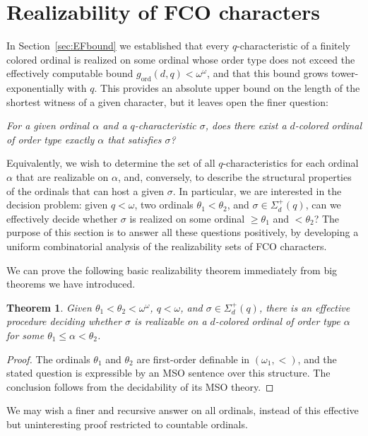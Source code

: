 \documentclass{amsart}
\newtheorem{theorem}{Theorem}
\theoremstyle{definition}
\begin{document}
\section{Realizability of FCO characters}\label{sec:realizability}

In Section~\ref{sec:EFbound} we established that every $q$-characteristic of a finitely colored ordinal is realized on some ordinal whose order type does not exceed the effectively computable bound $g_{\mathrm{ord}}(d,q)<\omega^\omega$, and that this bound grows tower-exponentially with $q$.  This provides an absolute upper bound on the length of the shortest witness of a given character, but it leaves open the finer question: 

\emph{For a given ordinal $\alpha$ and a $q$-characteristic $\sigma$, does there exist a $d$-colored ordinal of order type exactly $\alpha$ that satisfies $\sigma$?}

Equivalently, we wish to determine the set of all $q$-characteristics for each ordinal $\alpha$ that are realizable on $\alpha$, and, conversely, to describe the structural properties of the ordinals that can host a given $\sigma$.  In particular, we are interested in the decision problem: given $q<\omega$, two ordinals $\theta_1<\theta_2$, and $\sigma\in\Sigma_d^+(q)$, can we effectively decide whether $\sigma$ is realized on some ordinal $\geq\theta_1$ and $<\theta_2$?  The purpose of this section is to answer all these questions positively, by developing a uniform combinatorial analysis of the realizability sets of FCO characters.

We can prove the following basic realizability theorem immediately from big theorems we have introduced.

\begin{theorem}\label{lem:interval-realizabiliy}
    Given $\theta_1<\theta_2<\omega^\omega$, $q<\omega$, and $\sigma\in\Sigma_d^+(q)$, there is an effective procedure deciding whether $\sigma$ is realizable on a $d$-colored ordinal of order type $\alpha$ for some $\theta_1\leq\alpha<\theta_2$.
\end{theorem}
\begin{proof}
    The ordinals $\theta_1$ and $\theta_2$ are first-order definable in $(\omega_1,<)$, and the stated question is expressible by an MSO sentence over this structure. The conclusion follows from the decidability of its MSO theory.
\end{proof}

We may wish a finer and recursive answer on all ordinals, instead of this effective but uninteresting proof restricted to countable ordinals.
\end{document}
